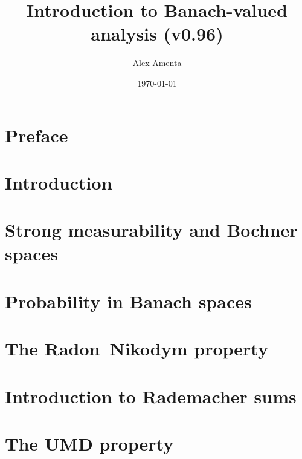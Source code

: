 \documentclass[a4paper,10pt]{amsbook}
\begin{document}
\title[Banach-valued analysis]{Introduction to Banach-valued analysis (v0.96)}
\date{\today}

\author[A. Amenta]{Alex Amenta}
\address{\noindent Mathematisches Institut \newline \indent Universit\"at Bonn, Bonn, Germany}

\maketitle
\tableofcontents


\chapter*{Preface}


\chapter{Introduction}
\label{sec:intro}


\chapter{Strong measurability and Bochner spaces}
\label{sec:Bochner-spaces}


\chapter{Probability in Banach spaces}
\label{sec:martingales} 


\chapter{The Radon--Nikodym property}
\label{sec:RNP}


\chapter{Introduction to Rademacher sums}
\label{sec:rademacher}


\chapter{The UMD property}
\label{sec:UMD}

\end{document}
